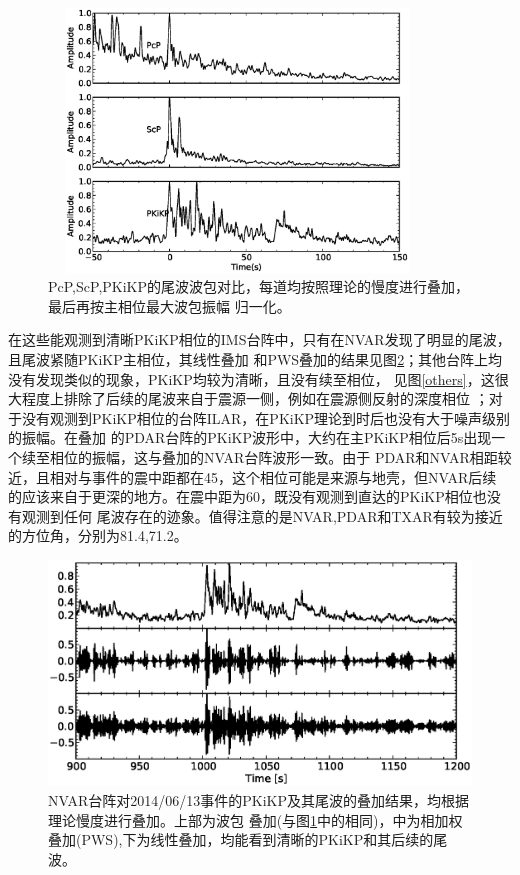 \begin{figure}
	\centering
	\includegraphics[width=10cm,height=7cm]{fig/chap3/nvar_env.eps}
	\caption{PcP,ScP,PKiKP的尾波波包对比，每道均按照理论的慢度进行叠加，最后再按主相位最大波包振幅%
归一化。}
	\label{nvar_env}
\end{figure}

在这些能观测到清晰PKiKP相位的IMS台阵中，只有在NVAR发现了明显的尾波，且尾波紧随PKiKP主相位，其线性叠加
和PWS叠加的结果见图\ref{nvar_mul}；其他台阵上均没有发现类似的现象，PKiKP均较为清晰，且没有续至相位，
见图\ref{others}，这很大程度上排除了后续的尾波来自于震源一侧，例如在震源侧反射的深度相位
；对于没有观测到PKiKP相位的台阵ILAR，在PKiKP理论到时后也没有大于噪声级别的振幅。在叠加
的PDAR台阵的PKiKP波形中，大约在主PKiKP相位后5s出现一个续至相位的振幅，这与叠加的NVAR台阵波形一致。由于
PDAR和NVAR相距较近，且相对与事件的震中距都在45，这个相位可能是来源与地壳，但NVAR后续
的应该来自于更深的地方。在震中距为60，既没有观测到直达的PKiKP相位也没有观测到任何
尾波存在的迹象。值得注意的是NVAR,PDAR和TXAR有较为接近的方位角，分别为81.4\textdegree,71.2\textdegree。

\begin{figure}
	\centering
	\includegraphics[width=12cm,height=6cm]{fig/chap3/nvar_mul.eps}
	\caption{NVAR台阵对2014/06/13事件的PKiKP及其尾波的叠加结果，均根据理论慢度进行叠加。上部为波包%
叠加(与图\ref{nvar_env}中的相同)，中为相加权叠加(PWS),下为线性叠加，均能看到清晰的PKiKP和其后续的尾波。}
	\label{nvar_mul}
\end{figure}


